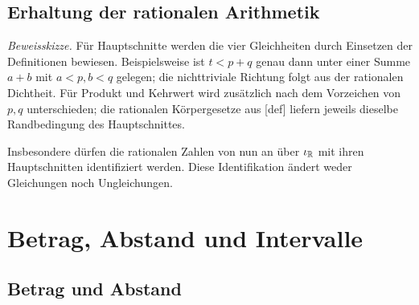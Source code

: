 \documentclass[main.tex]{subfiles}
\begin{document}
\section{Erhaltung der rationalen Arithmetik}


\emph{Beweisskizze.}
Für Hauptschnitte werden die vier Gleichheiten durch Einsetzen der
Definitionen bewiesen. Beispielsweise ist \(t<p+q\) genau dann unter einer
Summe \(a+b\) mit \(a<p,b<q\) gelegen; die nichttriviale Richtung folgt aus
der rationalen Dichtheit. Für Produkt und Kehrwert wird zusätzlich nach dem
Vorzeichen von \(p,q\) unterschieden; die rationalen Körpergesetze aus
[def] liefern jeweils dieselbe
Randbedingung des Hauptschnittes.

Insbesondere dürfen die rationalen Zahlen von nun an über \(\iota_{\mathbb R}\) mit
ihren Hauptschnitten identifiziert werden. Diese Identifikation ändert weder
Gleichungen noch Ungleichungen.

\chapter{Betrag, Abstand und Intervalle}

\section{Betrag und Abstand}

\end{document}
